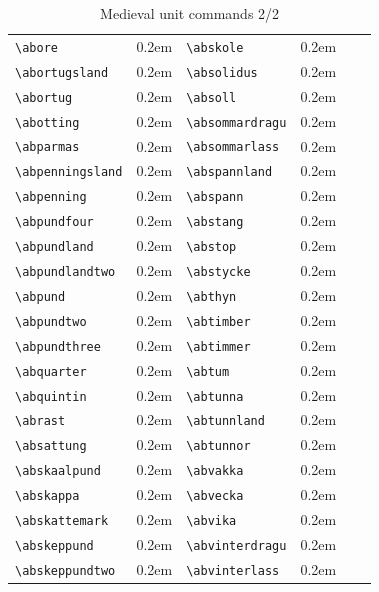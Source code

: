 \documentclass[a4paper]{article}
\newcommand{\samplefont}{\fontsize{16}{16}\abcursivefamily\spaceskip0.2em}
\newcommand{\sample}[1]{{\samplefont #1 \strut}}
\newcommand{\ltxncmd}[1]{\texttt{\textbackslash{}#1}}
\begin{document}
\begin{table}
  \begin{tabular}{llllll}
\ltxncmd{abore} & \sample{\abore} & \ltxncmd{abskole} & \sample{\abskole} \\
\ltxncmd{abortugsland} & \sample{\abortugsland} & \ltxncmd{absolidus} & \sample{\absolidus} \\
\ltxncmd{abortug} & \sample{\abortug} & \ltxncmd{absoll} & \sample{\absoll} \\
\ltxncmd{abotting} & \sample{\abotting} & \ltxncmd{absommardragu} & \sample{\absommardragu} \\
\ltxncmd{abparmas} & \sample{\abparmas} & \ltxncmd{absommarlass} & \sample{\absommarlass} \\
\ltxncmd{abpenningsland} & \sample{\abpenningsland} & \ltxncmd{abspannland} & \sample{\abspannland} \\
\ltxncmd{abpenning} & \sample{\abpenning} & \ltxncmd{abspann} & \sample{\abspann} \\
\ltxncmd{abpundfour} & \sample{\abpundfour} & \ltxncmd{abstang} & \sample{\abstang} \\
\ltxncmd{abpundland} & \sample{\abpundland} & \ltxncmd{abstop} & \sample{\abstop} \\
\ltxncmd{abpundlandtwo} & \sample{\abpundlandtwo} & \ltxncmd{abstycke} & \sample{\abstycke} \\
\ltxncmd{abpund} & \sample{\abpund} & \ltxncmd{abthyn} & \sample{\abthyn} \\
\ltxncmd{abpundtwo} & \sample{\abpundtwo} & \ltxncmd{abtimber} & \sample{\abtimber} \\
\ltxncmd{abpundthree} & \sample{\abpundthree} & \ltxncmd{abtimmer} & \sample{\abtimmer} \\
\ltxncmd{abquarter} & \sample{\abquarter} & \ltxncmd{abtum} & \sample{\abtum} \\
\ltxncmd{abquintin} & \sample{\abquintin} & \ltxncmd{abtunna} & \sample{\abtunna} \\
\ltxncmd{abrast} & \sample{\abrast} & \ltxncmd{abtunnland} & \sample{\abtunnland} \\
\ltxncmd{absattung} & \sample{\absattung} & \ltxncmd{abtunnor} & \sample{\abtunnor} \\
\ltxncmd{abskaalpund} & \sample{\abskaalpund} & \ltxncmd{abvakka} & \sample{\abvakka} \\
\ltxncmd{abskappa} & \sample{\abskappa} & \ltxncmd{abvecka} & \sample{\abvecka} \\
\ltxncmd{abskattemark} & \sample{\abskattemark} & \ltxncmd{abvika} & \sample{\abvika} \\
\ltxncmd{abskeppund} & \sample{\abskeppund} & \ltxncmd{abvinterdragu} & \sample{\abvinterdragu} \\
\ltxncmd{abskeppundtwo} & \sample{\abskeppundtwo} & \ltxncmd{abvinterlass} & \sample{\abvinterlass} \\
  \end{tabular}
  \caption{Medieval unit commands 2/2}
  \label{tab:abbreviation_commands_2}
\end{table}
\end{document}
